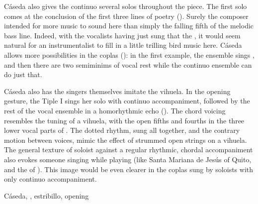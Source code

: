 
Cáseda also gives the continuo several solos throughout the piece.
The first solo comes at the conclusion of the first three lines of poetry
().
Surely the composer intended for more music to sound here than simply the
falling fifth of the melodic bass line.
Indeed, with the vocalists having just sung that the , it would seem natural for an instrumentalist
to fill in a little trilling bird music here.
Cáseda allows more possibilities in the coplas (): in the first example, the ensemble sings , and then there are two semiminims of vocal rest while the
continuo ensemble can do just that.


Cáseda also has the singers themselves imitate the vihuela.
In the opening gesture, the Tiple I sings her solo with continuo accompaniment,
followed by the rest of the vocal ensemble in a homorhythmic echo
().
The chord voicing resembles the tuning of a vihuela, with the open fifths and
fourths in the three lower vocal parts of .
The dotted rhythm, sung all together, and the contrary motion between voices,
mimic the effect of strummed open strings on a vihuela.
The general texture of soloist against a regular rhythmic, chordal
accompaniment also evokes someone singing while playing (like Santa Mariana de
Jesús of Quito, and the  of ).
This image would be even clearer in the coplas sung by soloists with only
continuo accompaniment.


\begin{musicexample}
    \caption{Cáseda, , estribillo, opening}
    \label{mus:CasedaJ-Que_musica_divina-opening}
\end{musicexample}


